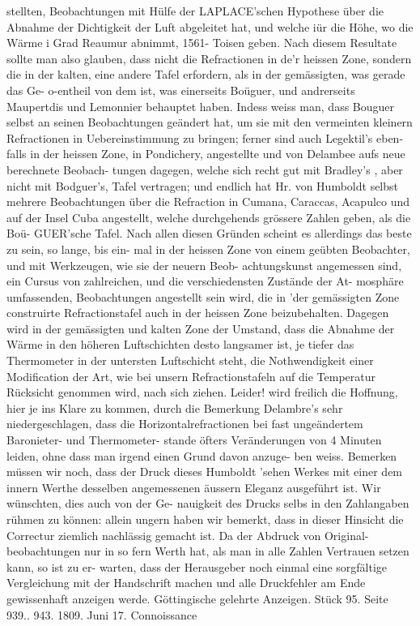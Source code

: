 \documentclass[12pt,a4paper]{article}
\begin{document}
stellten,  Beobachtungen  mit  Hülfe  der  LAPLACE'schen  Hypothese  über  die  Abnahme  der  Dichtigkeit  der Luft  abgeleitet  hat,  und  welche  iür  die  Höhe,  wo  die  Wärme  i  Grad  Reaumur  abnimmt,  1561-  Toisen geben.  Nach  diesem  Resultate  sollte  man  also  glauben,  dass  nicht  die  Refractionen  in  de'r  heissen  Zone, sondern  die  in  der  kalten,  eine  andere  Tafel  erfordern,  als  in  der  gemässigten,  was  gerade  das  Ge- o-entheil  von  dem  ist,  was  einerseits  Boüguer,  und  andrerseits  Maupertdis  und  Lemonnier  behauptet haben.  Indess  weiss  man,  dass  Bouguer  selbst  an  seinen  Beobachtungen  geändert  hat,  um  sie  mit  den vermeinten  kleinern  Refractionen  in  Uebereinstimmung  zu  bringen;  ferner  sind  auch  Legektil's  eben- falls in  der  heissen  Zone,  in  Pondichery,  angestellte  und  von  Delambee  aufs  neue  berechnete  Beobach- tungen dagegen,  welche  sich  recht  gut  mit  Bradley's  ,  aber  nicht  mit  Bodguer's,  Tafel  vertragen;  und endlich  hat  Hr.  von  Humboldt  selbst  mehrere  Beobachtungen  über  die  Refraction  in  Cumana,  Caraccas, Acapulco  und  auf  der  Insel  Cuba  angestellt,  welche  durchgehends  grössere  Zahlen  geben,  als  die  Boü- GUER'sche  Tafel.  Nach  allen  diesen  Gründen  scheint  es  allerdings  das  beste  zu  sein,  so  lange,  bis  ein- mal in  der  heissen  Zone  von  einem  geübten  Beobachter,  und  mit  Werkzeugen,  wie  sie  der  neuern  Beob- achtungskunst angemessen  sind,  ein  Cursus  von  zahlreichen,  und  die  verschiedensten  Zustände  der  At- mosphäre umfassenden,  Beobachtungen  angestellt  sein  wird,  die  in  'der  gemässigten  Zone  construirte Refractionstafel  auch  in  der  heissen  Zone  beizubehalten.  Dagegen  wird  in  der  gemässigten  und  kalten Zone  der  Umstand,  dass  die  Abnahme  der  Wärme  in  den  höheren  Luftschichten  desto  langsamer  ist, je  tiefer  das  Thermometer  in  der  untersten  Luftschicht  steht,  die  Nothwendigkeit  einer  Modification  der Art,  wie  bei  unsern  Refractionstafeln  auf  die  Temperatur  Rücksicht  genommen  wird,  nach  sich  ziehen. Leider!  wird  freilich  die  Hoffnung,  hier  je  ins  Klare  zu  kommen,  durch  die  Bemerkung  Delambre's  sehr niedergeschlagen,  dass  die  Horizontalrefractionen  bei  fast  ungeändertem  Baronieter-  und  Thermometer- stande öfters  Veränderungen  von  4  Minuten  leiden,  ohne  dass  man  irgend  einen  Grund  davon  anzuge- ben weiss. Bemerken  müssen  wir  noch,  dass  der  Druck  dieses  Humboldt 'sehen  Werkes  mit  einer  dem  innern Werthe  desselben  angemessenen  äussern  Eleganz  ausgeführt  ist.  Wir  wünschten,  dies  auch  von  der  Ge- nauigkeit des  Drucks  selbs  in  den  Zahlangaben  rühmen  zu  können:  allein  ungern  haben  wir  bemerkt, dass  in  dieser  Hinsicht  die  Correctur  ziemlich  nachlässig  gemacht  ist.  Da  der  Abdruck  von  Original- beobachtungen nur  in  so  fern  Werth  hat,  als  man  in  alle  Zahlen  Vertrauen  setzen  kann,  so  ist  zu  er- warten, dass  der  Herausgeber  noch  einmal  eine  sorgfältige  Vergleichung  mit  der  Handschrift  machen und  alle  Druckfehler  am  Ende  gewissenhaft  anzeigen  werde. Göttingische  gelehrte  Anzeigen.     Stück  95.     Seite  939.. 943.     1809.  Juni  17. Connoissance  
\end{document}
